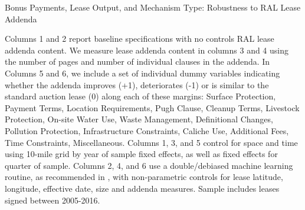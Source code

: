 \begin{appendices}
\begin{table}[H]
\begin{center}
\begin{threeparttable}
	\caption{Bonus Payments, Lease Output, and Mechanism Type: Robustness to RAL Lease Addenda}
	\label{tab:table_bonus_addenda}
 	\small
   	            
    \footnotesize
    \begin{tablenotes}
    	\item Columns 1 and 2 report baseline specifications with no controls RAL lease addenda content.  We measure lease addenda content in columns 3 and 4 using the number of pages and number of individual clauses in the addenda.  In Columns 5 and 6, we include a set of individual dummy variables indicating whether the addenda improves (+1), deteriorates (-1) or is similar to the standard auction lease (0) along each of these margins: Surface Protection, Payment Terms, Location Requirements, Pugh Clause, Cleanup Terms, Livestock Protection, On-site Water Use, Waste Management, Definitional Changes, Pollution Protection, Infrastructure Constraints, Caliche Use, Additional Fees, Time Constraints, Miscellaneous. Columns 1, 3, and 5 control for space and time using 10-mile grid by year of sample fixed effects, as well as fixed effects for quarter of sample.  Columns 2, 4, and 6 use a double/debiased machine learning routine, as recommended in \cite{chernozhukov2018double}, with non-parametric controls for lease latitude, longitude, effective date, size and addenda measures.  Sample includes leases signed between 2005-2016.
    \end{tablenotes}
\end{threeparttable}
\end{center}
\end{table}

\end{appendices}